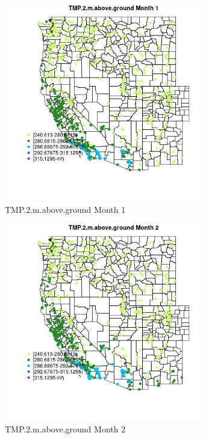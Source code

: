 \begin{figure} 
\centering  
\includegraphics[width=0.77\textwidth]{Code_Outputs/Report_ML_input_PM25_Step4_part_f_de_duplicated_aves_prioritize_24hr_obswNAs_MapObsMo1TMP2maboveground.jpg} 
\caption{\label{fig:Report_ML_input_PM25_Step4_part_f_de_duplicated_aves_prioritize_24hr_obswNAsMapObsMo1TMP2maboveground}TMP.2.m.above.ground Month 1} 
\end{figure} 
 

\begin{figure} 
\centering  
\includegraphics[width=0.77\textwidth]{Code_Outputs/Report_ML_input_PM25_Step4_part_f_de_duplicated_aves_prioritize_24hr_obswNAs_MapObsMo2TMP2maboveground.jpg} 
\caption{\label{fig:Report_ML_input_PM25_Step4_part_f_de_duplicated_aves_prioritize_24hr_obswNAsMapObsMo2TMP2maboveground}TMP.2.m.above.ground Month 2} 
\end{figure} 
 

